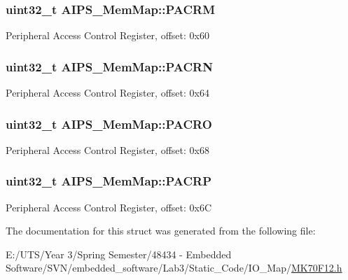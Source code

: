 \subsubsection[{P\+A\+C\+R\+M}]{\setlength{\rightskip}{0pt plus 5cm}uint32\+\_\+t A\+I\+P\+S\+\_\+\+Mem\+Map\+::\+P\+A\+C\+R\+M}\label{struct_a_i_p_s___mem_map_a30e7ebe0ffb0e9d97cbfa85d65e17cbb}
Peripheral Access Control Register, offset\+: 0x60 \hypertarget{struct_a_i_p_s___mem_map_a83bf08b950901b8f6d7ef2ceb960baa8}{}
\subsubsection[{P\+A\+C\+R\+N}]{\setlength{\rightskip}{0pt plus 5cm}uint32\+\_\+t A\+I\+P\+S\+\_\+\+Mem\+Map\+::\+P\+A\+C\+R\+N}\label{struct_a_i_p_s___mem_map_a83bf08b950901b8f6d7ef2ceb960baa8}
Peripheral Access Control Register, offset\+: 0x64 \hypertarget{struct_a_i_p_s___mem_map_a5892f2b025c43f875f1c88e3a8f6da30}{}
\subsubsection[{P\+A\+C\+R\+O}]{\setlength{\rightskip}{0pt plus 5cm}uint32\+\_\+t A\+I\+P\+S\+\_\+\+Mem\+Map\+::\+P\+A\+C\+R\+O}\label{struct_a_i_p_s___mem_map_a5892f2b025c43f875f1c88e3a8f6da30}
Peripheral Access Control Register, offset\+: 0x68 \hypertarget{struct_a_i_p_s___mem_map_af6d96671be0c664042ec003595ac405e}{}
\subsubsection[{P\+A\+C\+R\+P}]{\setlength{\rightskip}{0pt plus 5cm}uint32\+\_\+t A\+I\+P\+S\+\_\+\+Mem\+Map\+::\+P\+A\+C\+R\+P}\label{struct_a_i_p_s___mem_map_af6d96671be0c664042ec003595ac405e}
Peripheral Access Control Register, offset\+: 0x6\+C 

The documentation for this struct was generated from the following file\+:\begin{DoxyCompactItemize}
\item 
E\+:/\+U\+T\+S/\+Year 3/\+Spring Semester/48434 -\/ Embedded Software/\+S\+V\+N/embedded\+\_\+software/\+Lab3/\+Static\+\_\+\+Code/\+I\+O\+\_\+\+Map/\hyperlink{_m_k70_f12_8h}{M\+K70\+F12.\+h}\end{DoxyCompactItemize}
